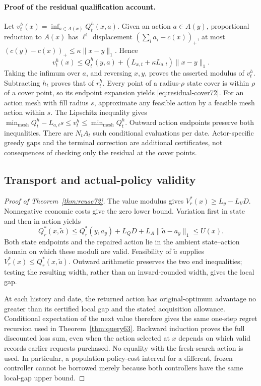 \paragraph{Proof of the residual qualification account.}
Let $v_t^h(x)=\inf_{a\in A(x)}Q_t^h(x,a)$. Given an action $a\in A(y)$, proportional reduction to $A(x)$ has $\ell^1$ displacement $(\sum_i a_i-c(x))_+$, at most $(c(y)-c(x))_+\le\kappa\|x-y\|_1$. Hence
\[
 v_t^h(x)\le Q_t^h(y,a)+(L_{x,t}+\kappa L_{a,t})\|x-y\|_1.
\]
Taking the infimum over $a$, and reversing $x,y$, proves the asserted modulus of $v_t^h$. Subtracting $h_t$ proves that of $r_t^h$. Every point of a radius-$\rho$ state cover is within $\rho$ of a cover point, so its endpoint expansion yields \eqref{eq:residual-cover72}. For an action mesh with fill radius $s$, approximate any feasible action by a feasible mesh action within $s$. The Lipschitz inequality gives $\min_{\mathrm{mesh}}Q_t^h-L_{a,t}s\le v_t^h\le\min_{\mathrm{mesh}}Q_t^h$. Outward action endpoints preserve both inequalities. There are $N_tA_t$ such conditional evaluations per date. Actor-specific greedy gaps and the terminal correction are additional certificates, not consequences of checking only the residual at the cover points.

\subsection{Transport and actual-policy validity}\label{supp:transport72}
\begin{proof}[Proof of Theorem~\ref{thm:reuse72}]
The value modulus gives $V_r^*(x)\ge L_y-L_VD$. Nonnegative economic costs give the zero lower bound. Variation first in state and then in action yields
\[
 Q_r^*(x,\widetilde a)
 \le Q_r^*(y,a_y)+L_QD+L_A\|\widetilde a-a_y\|_1
 \le U(x).
\]
Both state endpoints and the repaired action lie in the ambient state--action domain on which these moduli are valid. Feasibility of $\widetilde a$ supplies $V_r^*(x)\le Q_r^*(x,\widetilde a)$. Outward arithmetic preserves the two end inequalities; testing the resulting width, rather than an inward-rounded width, gives the local gap.

At each history and date, the returned action has original-optimum advantage no greater than its certified local gap and the stated acquisition allowance. Conditional expectation of the next value therefore gives the same one-step regret recursion used in Theorem~\ref{thm:query63}. Backward induction proves the full discounted loss sum, even when the action selected at $x$ depends on which valid records earlier requests purchased. No equality with the fresh-search action is used. In particular, a population policy-cost interval for a different, frozen controller cannot be borrowed merely because both controllers have the same local-gap upper bound.
\end{proof}

